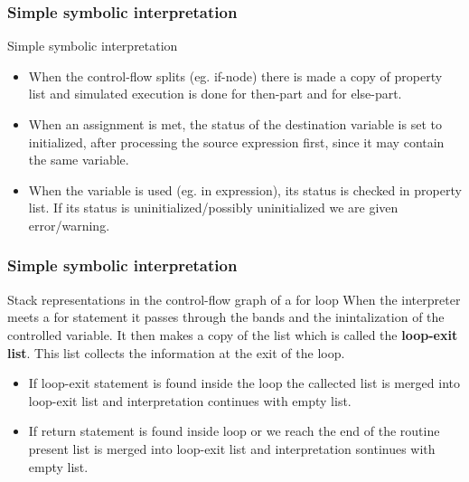 \documentclass[presentation]{beamer}
\begin{document}
\begin{frame}
  \frametitle{Simple symbolic interpretation}
  
  \begin{block}{Simple symbolic interpretation}
  \begin{itemize}
    \item When the control-flow splits (eg. if-node) there is made a copy of property list and simulated execution is done for then-part and for else-part.
    \item When an assignment is met, the status of the destination variable is set to
    initialized, after processing the source expression first, since it may contain the same
    variable.
    \item When the variable is used (eg. in expression), its status is checked in property list. If its status is uninitialized/possibly uninitialized we are given error/warning.
    \end{itemize}
 
  \end{block}
  
\end{frame}

\begin{frame}
  \frametitle{Simple symbolic interpretation}
  
  \begin{block}{Stack representations in the control-flow graph of a for loop}
  When the interpreter meets a for statement it passes through the bands and the inintalization of the controlled variable. It then makes a copy of the list which is called the \textbf{loop-exit list}. This list collects the information at the exit of the loop.\\
  \begin{itemize}
      \item If loop-exit statement is found inside the loop the callected list is merged into loop-exit list and interpretation continues with empty list.\\
      \item If return statement is found inside loop or we reach the end of the routine present list is merged into loop-exit list and interpretation sontinues with empty list.
  \end{itemize}
  \end{block}
  
\end{frame}
\end{document}
